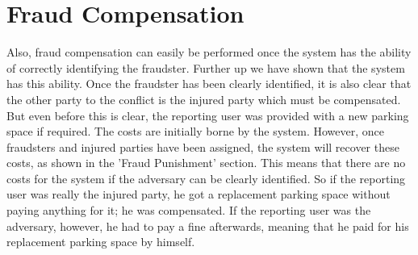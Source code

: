 \section{Fraud Compensation}
Also, fraud compensation can easily be performed once the system has the ability of correctly identifying the fraudster. Further up we have shown that the system has this ability. Once the fraudster has been clearly identified, it is also clear that the other party to the conflict is the injured party which must be compensated. \\

But even before this is clear, the reporting user was provided with a new parking space if required. The costs are initially borne by the system. However, once fraudsters and injured parties have been assigned, the system will recover these costs, as shown in the 'Fraud Punishment' section. This means that there are no costs for the system if the adversary can be clearly identified. So if the reporting user was really the injured party, he got a replacement parking space without paying anything for it; he was compensated. If the reporting user was the adversary, however, he had to pay a fine afterwards, meaning that he paid for his replacement parking space by himself.